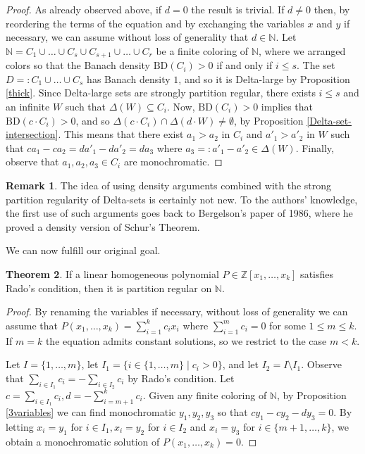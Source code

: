 \documentclass[a4paper,oneside]{article}
\newcommand{\N}{\mathbb{N}}
\newcommand{\Z}{\mathbb{Z}}
\theoremstyle{definition}
\newtheorem{theorem}{Theorem}[section]
\newtheorem{remark}[theorem]{Remark}
\theoremstyle{named}
\begin{document}
\begin{proof} As already observed above, if $d=0$ the result is trivial. 
If $d\neq 0$ then, by reordering the terms of the equation and by 
exchanging the variables $x$ and $y$ if necessary,
we can assume without loss of generality that $d\in\N$. 
Let $\N=C_1\cup\ldots\cup C_s\cup C_{s+1}\cup\ldots\cup C_r$ be a finite coloring of 
$\N$, where we arranged colors so that 
the Banach density $\text{BD}(C_i)>0$ if and only if $i\le s$.
The set $D=:C_1\cup\ldots\cup C_s$ has Banach density $1$, 
and so it is Delta-large by Proposition \ref{thick}.
Since Delta-large sets are strongly partition regular, there exists $i\le s$ and
an infinite $W$ such that $\Delta(W)\subseteq C_i$.
Now, $\text{BD}(C_i)>0$ implies that $\text{BD}(c\cdot C_i)>0$, and so
$\Delta(c\cdot C_i)\cap\Delta(d\cdot W)\ne\emptyset$, by Proposition \ref{Delta-set-intersection}.
This means that there exist $a_1>a_2$ in $C_i$ and $a'_1>a'_2$ in $W$ such that 
$ca_1-ca_2=da'_1-da'_2=da_3$ where $a_3=:a'_1-a'_2\in\Delta(W)$. 
Finally, observe that $a_1,a_2,a_3\in C_i$ are monochromatic. 
\end{proof}



\begin{remark}
{\rm The idea of using density arguments combined with the strong partition regularity of
Delta-sets is certainly not new. To the authors' knowledge, the first use of such arguments 
goes back to Bergelson's paper \cite{be} of 1986, where he proved
a density version of Schur's Theorem.}
\end{remark}

We can now fulfill our original goal.

\begin{theorem}\label{finale}
If a linear homogeneous polynomial $P\in\Z[x_1,\ldots,x_k]$ 
satisfies Rado's condition, then it is partition regular on $\N$.
\end{theorem}

\begin{proof}
By renaming the variables if necessary, without loss of generality we can assume 
that $P(x_1,\ldots,x_k)=\sum_{i=1}^{k}c_i x_i$ 
where $\sum_{i=1}^m c_i=0$ for some $1\le m\le k$. If $m=k$ the equation admits constant solutions, so we restrict to the case $m<k$.

Let $I=\{1,\dots,m\}$, let $I_{1}=\{i\in \{1,\dots,m\}\mid c_{i}>0\}$, and let $I_{2}=I\setminus I_{1}$. 
Observe that $\sum_{i\in I_{1}} c_{i}=-\sum_{i\in I_{2}} c_{i}$ by Rado's condition. 
Let $c=\sum_{i\in I_{1}} c_{i}, d=-\sum_{i=m+1}^{k} c_{i}$. 
Given any finite coloring of $\N$, by Proposition \ref{3variables} 
we can find monochromatic $y_{1},y_{2},y_{3}$ so that $cy_{1}-cy_{2}-dy_{3}=0$. 
By letting $x_{i}=y_{1}$ for $i\in I_{1}, x_{i}=y_{2}$ for $i\in I_{2}$ and $x_{i}=y_{3}$ 
for $i\in \{m+1,\dots,k\}$, we obtain a monochromatic solution of $P\left(x_{1},\dots,x_{k}\right)=0$.
\end{proof}
\end{document}
